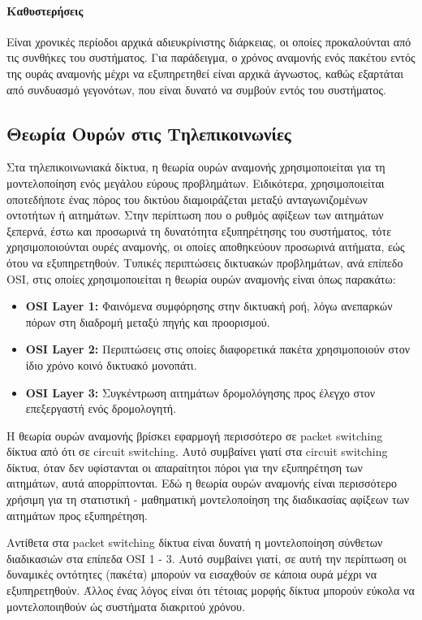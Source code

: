 \documentclass[12pt]{report}
\begin{document}
\paragraph{Καθυστερήσεις} Είναι χρονικές περίοδοι αρχικά αδιευκρίνιστης διάρκειας, οι οποίες προκαλούνται από τις συνθήκες του συστήματος. Για παράδειγμα, ο χρόνος αναμονής ενός πακέτου εντός της ουράς αναμονής μέχρι να εξυπηρετηθεί είναι αρχικά άγνωστος, καθώς εξαρτάται από συνδυασμό γεγονότων, που είναι δυνατό να συμβούν εντός του συστήματος.

\subsection{Θεωρία Ουρών στις Τηλεπικοινωνίες}\label{queues}
Στα τηλεπικοινωνιακά δίκτυα, η θεωρία ουρών αναμονής χρησιμοποιείται για τη μοντελοποίηση ενός μεγάλου εύρους προβλημάτων. Ειδικότερα, χρησιμοποιείται οποτεδήποτε ένας πόρος του δικτύου διαμοιράζεται μεταξύ ανταγωνιζομένων οντοτήτων ή αιτημάτων. Στην περίπτωση που ο ρυθμός αφίξεων των αιτημάτων ξεπερνά, έστω και προσωρινά τη δυνατότητα εξυπηρέτησης του συστήματος, τότε χρησιμοποιούνται ουρές αναμονής, οι οποίες αποθηκεύουν προσωρινά αιτήματα, εώς ότου να εξυπηρετηθούν. Τυπικές περιπτώσεις δικτυακών προβλημάτων, ανά επίπεδο \textlatin{OSI}, στις οποίες χρησιμοποιείται η θεωρία ουρών αναμονής είναι όπως παρακάτω:

\begin{itemize}
  \item \textbf{\textlatin{OSI Layer 1:}} Φαινόμενα συμφόρησης στην δικτυακή ροή, λόγω ανεπαρκών πόρων στη διαδρομή μεταξύ πηγής και προορισμού.
  \item \textbf{\textlatin{OSI Layer 2:}} Περιπτώσεις στις οποίες διαφορετικά πακέτα χρησιμοποιούν στον ίδιο χρόνο κοινό δικτυακό μονοπάτι.
  \item \textbf{\textlatin{OSI Layer 3:}} Συγκέντρωση αιτημάτων δρομολόγησης προς έλεγχο στον επεξεργαστή ενός δρομολογητή.
\end{itemize}

Η θεωρία ουρών αναμονής βρίσκει εφαρμογή περισσότερο σε \textlatin{packet switching} δίκτυα από ότι σε \textlatin{circuit switching}. Αυτό συμβαίνει γιατί στα \textlatin{circuit switching} δίκτυα, όταν δεν υφίστανται οι απαραίτητοι πόροι για την εξυπηρέτηση των αιτημάτων, αυτά απορρίπτονται. Εδώ η θεωρία ουρών αναμονής είναι περισσότερο χρήσιμη για τη στατιστική - μαθηματική μοντελοποίηση της διαδικασίας αφίξεων των αιτημάτων προς εξυπηρέτηση.

Αντίθετα στα \textlatin{packet switching} δίκτυα είναι δυνατή η μοντελοποίηση σύνθετων διαδικασιών στα επίπεδα \textlatin{OSI 1 - 3}. Αυτό συμβαίνει γιατί, σε αυτή την περίπτωση οι δυναμικές οντότητες (πακέτα) μπορούν να εισαχθούν σε κάποια ουρά μέχρι να εξυπηρετηθούν. Άλλος ένας λόγος είναι ότι τέτοιας μορφής δίκτυα μπορούν εύκολα να μοντελοποιηθούν ώς συστήματα διακριτού χρόνου.
\end{document}
